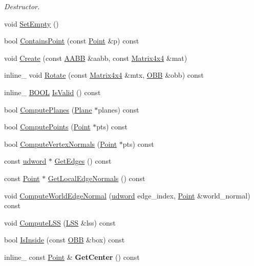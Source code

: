 \begin{DoxyCompactItemize}
\begin{DoxyCompactList}\small\item\em Destructor. \end{DoxyCompactList}\item 
void \hyperlink{classOpcode_1_1OBB_a437016469139ccf36929fe17bf2b08e1}{Set\+Empty} ()
\item 
bool \hyperlink{classOpcode_1_1OBB_a509e791cfa67b4e168e33dc5db3674b8}{Contains\+Point} (const \hyperlink{classOpcode_1_1Point}{Point} \&p) const 
\item 
void \hyperlink{classOpcode_1_1OBB_a86084565116d26baebe3ac3b7945000f}{Create} (const \hyperlink{classOpcode_1_1AABB}{A\+A\+BB} \&aabb, const \hyperlink{classOpcode_1_1Matrix4x4}{Matrix4x4} \&mat)
\item 
inline\+\_\+ void \hyperlink{classOpcode_1_1OBB_adb1dae689647e60917533bd51022a2f1}{Rotate} (const \hyperlink{classOpcode_1_1Matrix4x4}{Matrix4x4} \&mtx, \hyperlink{classOpcode_1_1OBB}{O\+BB} \&obb) const 
\item 
inline\+\_\+ \hyperlink{IceTypes_8h_a050c65e107f0c828f856a231f4b4e788}{B\+O\+OL} \hyperlink{classOpcode_1_1OBB_a342b15da7833d9242e4dd34e477a105d}{Is\+Valid} () const 
\item 
bool \hyperlink{classOpcode_1_1OBB_a4edd7fb37a2ecd2334bcdcace3cdcd08}{Compute\+Planes} (\hyperlink{classOpcode_1_1Plane}{Plane} $\ast$planes) const 
\item 
bool \hyperlink{classOpcode_1_1OBB_ad9b5da33320f558b258c58726bcf4aed}{Compute\+Points} (\hyperlink{classOpcode_1_1Point}{Point} $\ast$pts) const 
\item 
bool \hyperlink{classOpcode_1_1OBB_ac89ab861cbbfc1eb9a830d3dc6894d91}{Compute\+Vertex\+Normals} (\hyperlink{classOpcode_1_1Point}{Point} $\ast$pts) const 
\item 
const \hyperlink{IceTypes_8h_a44c6f1920ba5551225fb534f9d1a1733}{udword} $\ast$ \hyperlink{classOpcode_1_1OBB_a3cb304bdb9371054780c97d29f695686}{Get\+Edges} () const 
\item 
const \hyperlink{classOpcode_1_1Point}{Point} $\ast$ \hyperlink{classOpcode_1_1OBB_a71d63f343a1482d1f2227e2077c90192}{Get\+Local\+Edge\+Normals} () const 
\item 
void \hyperlink{classOpcode_1_1OBB_a6e8844c4d4b064a2cfbd142589af22a2}{Compute\+World\+Edge\+Normal} (\hyperlink{IceTypes_8h_a44c6f1920ba5551225fb534f9d1a1733}{udword} edge\+\_\+index, \hyperlink{classOpcode_1_1Point}{Point} \&world\+\_\+normal) const 
\item 
void \hyperlink{classOpcode_1_1OBB_ad94c92759c88eead1a8eab29896f6b6e}{Compute\+L\+SS} (\hyperlink{classOpcode_1_1LSS}{L\+SS} \&lss) const 
\item 
bool \hyperlink{classOpcode_1_1OBB_a8ba54f8335a9b5a4d18a98a0a0024dd7}{Is\+Inside} (const \hyperlink{classOpcode_1_1OBB}{O\+BB} \&box) const 
\item 
inline\+\_\+ const \hyperlink{classOpcode_1_1Point}{Point} \& {\bfseries Get\+Center} () const \hypertarget{classOpcode_1_1OBB_a4ac3fa3c5de4b708b657a233d1e4df93}{}\label{classOpcode_1_1OBB_a4ac3fa3c5de4b708b657a233d1e4df93}


\end{DoxyCompactItemize}

